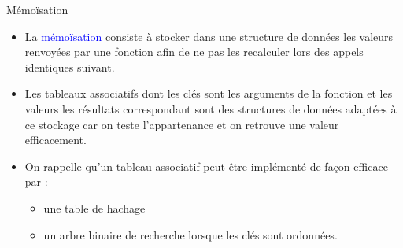 \documentclass[10pt]{beamer}
\begin{document}
\begin{frame}{\Ctitle}{\stitle}
	\begin{alertblock}{Mémoïsation}
		\begin{itemize}
			\item<1-> La \textcolor{blue}{mémoïsation} consiste à stocker dans une structure de données les valeurs renvoyées par une fonction afin de ne pas les recalculer lors des appels identiques suivant.\\
			\item<2-> Les tableaux associatifs dont les clés sont les arguments de la fonction et les valeurs les résultats correspondant sont des structures de données adaptées à ce stockage car on teste l'appartenance et on retrouve une valeur efficacement.
			\item<3-> On rappelle qu'un tableau associatif peut-être implémenté de façon efficace par :
			\begin{itemize}
				\item une table de hachage 
				\item un arbre binaire de recherche lorsque les clés sont ordonnées.
			\end{itemize}
		\end{itemize}
	\end{alertblock}
\end{frame}
\end{document}
